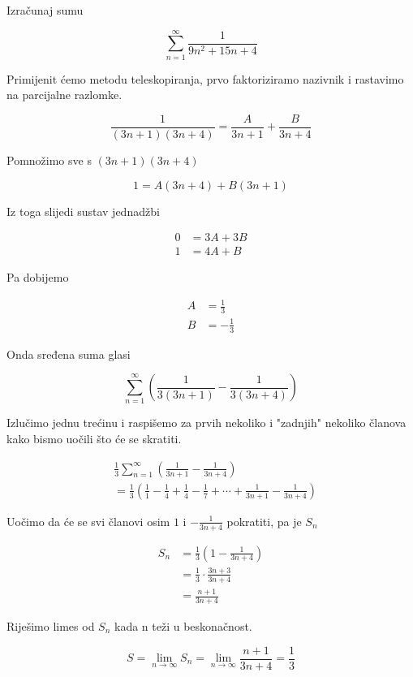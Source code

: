 \documentclass[exam.tex]{subfiles}
\begin{document}
	\begin{task}
		Izračunaj sumu
	
		\[ \sum\limits_{n=1}^\infty \frac{1}{9n^2 + 15n + 4} \]
	\end{task}
	
	Primijenit ćemo metodu teleskopiranja, prvo faktoriziramo nazivnik i rastavimo na parcijalne razlomke.
	
	\[ \frac{1}{(3n + 1)(3n + 4)} = \frac{A}{3n + 1} + \frac{B}{3n + 4} \]
	
	Pomnožimo sve s \( (3n + 1)(3n + 4) \)
	
	\[ 1 = A(3n + 4) + B(3n + 1) \]
	
	Iz toga slijedi sustav jednadžbi
	
	\begin{align*}
		0 &= 3A + 3B \\
		1 &= 4A + B
	\end{align*}
	
	Pa dobijemo
	
	\begin{align*}
		A &= \frac{1}{3} \\
		B &= - \frac{1}{3}
	\end{align*}
	
	Onda sređena suma glasi
	
	\[ \sum\limits_{n=1}^\infty \left ( \frac{1}{3(3n + 1)} - \frac{1}{3(3n + 4)} \right ) \]
	
	Izlučimo jednu trećinu i raspišemo za prvih nekoliko i "zadnjih" nekoliko članova kako bismo uočili što će se skratiti.
	
	\begin{align*}
		& \frac{1}{3} \sum\limits_{n=1}^\infty \left ( \frac{1}{3n + 1} - \frac{1}{3n + 4} \right ) \\ 
		&= \frac{1}{3} \left ( \frac{1}{1} - \frac{1}{4} + \frac{1}{4} - \frac{1}{7} + \cdots + \frac{1}{3n + 1} - \frac{1}{3n + 4} \right )
	\end{align*}
	
	Uočimo da će se svi članovi osim \( 1 \) i \( - \frac{1}{3n + 4} \) pokratiti, pa je \( S_n \)
	
	
	\begin{align*}
		S_n &= \frac{1}{3} \left ( 1 - \frac{1}{3n + 4} \right ) \\
		&= \frac{1}{3} \cdot \frac{3n + 3}{3n + 4} \\
		&= \frac{n + 1}{3n + 4}
	\end{align*}		
	
	Riješimo limes od \( S_n \) kada n teži u beskonačnost.
	
	\[ S = \lim_{n \to \infty} S_n = \lim_{n \to \infty} \frac{n + 1}{3n + 4} = \frac{1}{3} \]
\end{document}

